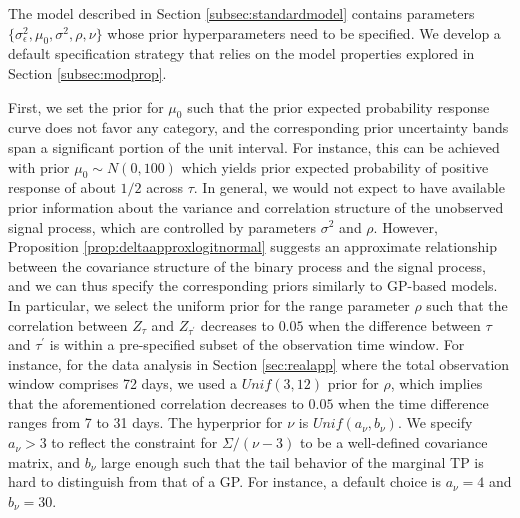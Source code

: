The model described in Section \ref{subsec:standardmodel} contains parameters 
$\{\sigma_{\epsilon}^2,\mu_0,\sigma^2,\rho,\nu\}$ whose prior hyperparameters need 
to be specified. We develop a default specification strategy that relies on the 
model properties explored in Section \ref{subsec:modprop}.

First, we set the prior for $\mu_0$ such that the prior expected probability 
response curve does not favor any category, and the corresponding prior uncertainty 
bands span a significant portion of the unit interval. For instance, this can 
be achieved with prior $\mu_0\sim N(0,100)$ which yields prior expected probability
of positive response of about $1/2$ across $\tau$.
In general, we would not expect to have available prior information about the 
variance and correlation structure of the unobserved signal process, which are 
controlled by parameters $\sigma^2$ and $\rho$. However, 
Proposition \ref{prop:deltaapproxlogitnormal} suggests an approximate relationship 
between the covariance structure of the binary process and the signal process, 
and we can thus specify the corresponding priors similarly to GP-based models. 
In particular, we select the uniform prior for the range parameter $\rho$ such that 
the correlation between $Z_{\tau}$ and $Z_{\tau^{\prime}}$ decreases to $0.05$ when 
the difference between $\tau$ and $\tau^{\prime}$ is within a pre-specified subset 
of the observation time window. For instance, for the data analysis in Section 
\ref{sec:realapp} where the total observation window comprises 72 days, we used a
$Unif(3,12)$ prior for $\rho$, which implies that the aforementioned correlation 
decreases to $0.05$ when the time difference ranges from 7 to 31 days. 
The hyperprior for $\nu$ is $Unif(a_{\nu},b_{\nu})$. We specify $a_{\nu}>3$ to 
reflect the constraint for $\Sigma/(\nu-3)$ to be a well-defined covariance matrix, 
and $b_{\nu}$ large enough such that the tail behavior of the marginal TP is hard 
to distinguish from that of a GP. For instance, a default choice is $a_{\nu}=4$ 
and $b_{\nu}=30$.


